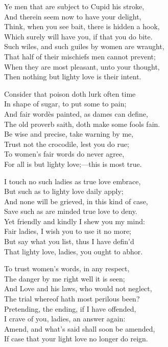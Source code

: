 \begin{dcverse}
Ye men that are subject to Cupid his stroke,\\
And therein seem now to have your delight,\\
Think, when you see bait, there is hidden a hook,\\
Which surely will have you, if that you do bite.\\
Such wiles, and such guiles by women are wraught,\\
That half of their mischiefs men cannot prevent;\\
When they are most pleasant, unto your thought,\\
Then nothing but lighty love is their intent.

Consider that poison doth lurk often time\\
In shape of sugar, to put some to pain;\\
And fair wordès painted, as dames can define,\\
The old proverb saith, doth make some fools fain.\\
Be wise and precise, take warning by me,\\
Trust not the crocodile, lest you do rue;\\
To women’s fair words do never agree,\\
For all is but lighty love;—this is most true.
\end{dcverse}
\pagebreak

\begin{dcverse}\footnotesize
I touch no such ladies as true love embrace,\\
But such as to lighty love daily apply;\\
And none will be grieved, in this kind of case,\\
Save such as are minded true love to deny.\\
Yet friendly and kindly I shew you my mind:\\
Fair ladies, I wish you to use it no more;\\
But say what you list, thus I have defin’d\\
That lighty love, ladies, you ought to abhor.

To trust women’s words, in any respect,\\
The danger by me right well it is seen;\\
And Love and his laws, who would not neglect,\\
The trial whereof hath most perilous been?\\
Pretending, the ending, if I have offended,\\
I crave of you, ladies, an answer again:\\
Amend, and what’s said shall soon be amended,\\
If case that your light love no longer do reign.
\end{dcverse}

